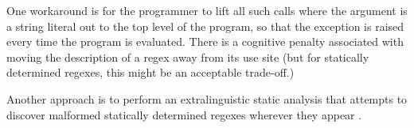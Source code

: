 \begin{enumerate}
One workaround is for the programmer to lift all such calls where the argument is a string literal out to the top level of the program, so that the exception is raised every time the program is evaluated. There is a cognitive penalty associated with moving the description of a regex away from its use site (but for statically determined regexes, this might be an acceptable trade-off.)%

Another approach is to perform an extralinguistic static analysis that attempts to discover malformed statically determined regexes wherever they appear \cite{spishak2012type}.




\end{enumerate}
